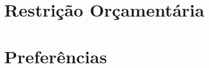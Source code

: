 \documentclass[a4paper,11pt,oneside]{book}
\theoremstyle{definition}
\theoremstyle{break}
\begin{document}

\chapter{Restrição Orçamentária}

\chapter{Preferências}
\end{document}
